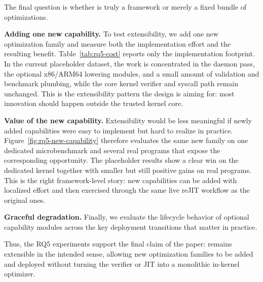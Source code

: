 The final question is whether \tool is truly a framework or merely a fixed bundle of optimizations.

\noindent\textbf{Adding one new capability.}
To test extensibility, we add one new optimization family and measure both the implementation effort and the resulting benefit. Table~\ref{tab:rq5-cost} reports only the implementation footprint. In the current placeholder dataset, the work is concentrated in the daemon pass, the optional x86/ARM64 lowering modules, and a small amount of validation and benchmark plumbing, while the core kernel verifier and syscall path remain unchanged. This is the extensibility pattern the design is aiming for: most innovation should happen outside the trusted kernel core.



\noindent\textbf{Value of the new capability.}
Extensibility would be less meaningful if newly added capabilities were easy to implement but hard to realize in practice. Figure~\ref{fig:rq5-new-capability} therefore evaluates the same new family on one dedicated microbenchmark and several real programs that expose the corresponding opportunity. The placeholder results show a clear win on the dedicated kernel together with smaller but still positive gains on real programs. This is the right framework-level story: new capabilities can be added with localized effort and then exercised through the same live reJIT workflow as the original ones.



\noindent\textbf{Graceful degradation.}
Finally, we evaluate the lifecycle behavior of optional capability modules across the key deployment transitions that matter in practice.



Thus, the RQ5 experiments support the final claim of the paper: \tool remains extensible in the intended sense, allowing new optimization families to be added and deployed without turning the verifier or JIT into a monolithic in-kernel optimizer.